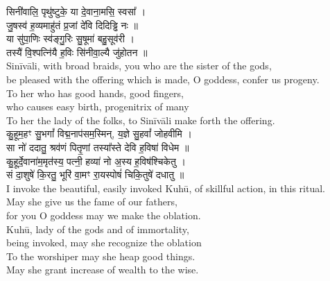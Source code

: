 \documentclass[11pt]{article}
\begin{document}
\begin{adjustwidth}{6em}{.2em}
{\large\skts\color{deepblue}
सिनी॑वालि॒ पृथु॑ष्टुके॒ या दे॒वाना॒मसि॒ स्वसा᳚ ।\\
जु॒षस्व॑ ह॒व्यमाहु॑तं प्र॒जां दे॑वि दिदिड्ढि नः ॥\\
या सु॑पा॒णिः स्व॑ङ्गु॒रिः सु॒षूमा॑ बहु॒सूव॑री ।\\
तस्यै॑ वि॒श्पत्नि॑यै ह॒विः सि॑नीवा॒ल्यै जु॑होतन ॥}\\[5pt]
Sinīvāli, with broad braids, you who are the sister of the gods,\\
be pleased with the offering which is made, O goddess, confer us progeny.\\
To her who has good hands, good fingers,\\ 
who causes easy birth, progenitrix of many\\
To her the lady of the folks, to Sinīvāli make forth the offering.\\[10pt]

{\large\skts\color{deepblue}
कु॒हूम॒हꣳ सु॒भगां᳚ विद्म॒नाप॑सम॒स्मिन्, य॒ज्ञे सु॒हवां᳚ जोहवीमि ।\\
सा नो॑ ददातु॒ श्रव॑णं पितृ॒णां तस्या᳚स्ते देवि ह॒विषा॑ विधेम ॥\\
कु॒हूर्दे॒वाना॑म॒मृत॑स्य॒ पत्नी॒ हव्या॑ नो अ॒स्य ह॒विष॑श्चिकेतु ।\\
सं दा॒शुषे॑ कि॒रतु॒ भूरि॑ वा॒मꣳ रा॒यस्पोषं॑ चिकि॒तुषे॑ दधातु ॥}\\[5pt]
I invoke the beautiful, easily invoked Kuhū, of skillful action, in this ritual.\\
May she give us the fame of our fathers,\\
for you O goddess may we make the oblation.\\
Kuhū, lady of the gods and of immortality,\\
being invoked, may she recognize the oblation\\
To the worshiper may she heap good things.\\
May she grant increase of wealth to the wise.\\
\end{adjustwidth}
\end{document}
